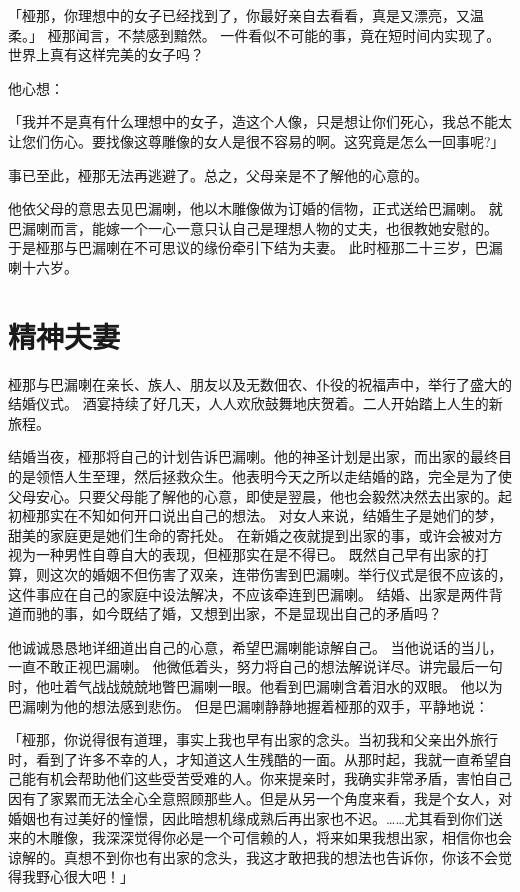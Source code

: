 \documentclass[twoside,openany]{book}
\begin{document}
「桠那，你理想中的女子已经找到了，你最好亲自去看看，真是又漂亮，又温柔。」
桠那闻言，不禁感到黯然。
一件看似不可能的事，竟在短时间内实现了。
世界上真有这样完美的女子吗？

他心想：

「我并不是真有什么理想中的女子，造这个人像，只是想让你们死心，我总不能太让您们伤心。要找像这尊雕像的女人是很不容易的啊。这究竟是怎么一回事呢?」

事已至此，桠那无法再逃避了。总之，父母亲是不了解他的心意的。

他依父母的意思去见巴漏喇，他以木雕像做为订婚的信物，正式送给巴漏喇。
就巴漏喇而言，能嫁一个一心一意只认自己是理想人物的丈夫，也很教她安慰的。
于是桠那与巴漏喇在不可思议的缘份牵引下结为夫妻。
此时桠那二十三岁，巴漏喇十六岁。

\section{精神夫妻}\label{sec4.3}

桠那与巴漏喇在亲长、族人、朋友以及无数佃农、仆役的祝福声中，举行了盛大的结婚仪式。
酒宴持续了好几天，人人欢欣鼓舞地庆贺着。二人开始踏上人生的新旅程。

结婚当夜，桠那将自己的计划告诉巴漏喇。他的神圣计划是出家，而出家的最终目的是领悟人生至理，然后拯救众生。他表明今天之所以走结婚的路，完全是为了使父母安心。只要父母能了解他的心意，即使是翌晨，他也会毅然决然去出家的。起初桠那实在不知如何开口说出自己的想法。
对女人来说，结婚生子是她们的梦，甜美的家庭更是她们生命的寄托处。
在新婚之夜就提到出家的事，或许会被对方视为一种男性自尊自大的表现，但桠那实在是不得已。
既然自己早有出家的打算，则这次的婚姻不但伤害了双亲，连带伤害到巴漏喇。举行仪式是很不应该的，这件事应在自己的家庭中设法解决，不应该牵连到巴漏喇。
结婚、出家是两件背道而驰的事，如今既结了婚，又想到出家，不是显现出自己的矛盾吗？

他诚诚恳恳地详细道出自己的心意，希望巴漏喇能谅解自己。
当他说话的当儿，一直不敢正视巴漏喇。
他微低着头，努力将自己的想法解说详尽。讲完最后一句时，他吐着气战战兢兢地瞥巴漏喇一眼。他看到巴漏喇含着泪水的双眼。
他以为巴漏喇为他的想法感到悲伤。
但是巴漏喇静静地握着桠那的双手，平静地说：

「桠那，你说得很有道理，事实上我也早有出家的念头。当初我和父亲出外旅行时，看到了许多不幸的人，才知道这人生残酷的一面。从那时起，我就一直希望自己能有机会帮助他们这些受苦受难的人。你来提亲时，我确实非常矛盾，害怕自己因有了家累而无法全心全意照顾那些人。但是从另一个角度来看，我是个女人，对婚姻也有过美好的憧憬，因此暗想机缘成熟后再出家也不迟。……尤其看到你们送来的木雕像，我深深觉得你必是一个可信赖的人，将来如果我想出家，相信你也会谅解的。真想不到你也有出家的念头，我这才敢把我的想法也告诉你，你该不会觉得我野心很大吧！」
\end{document}
